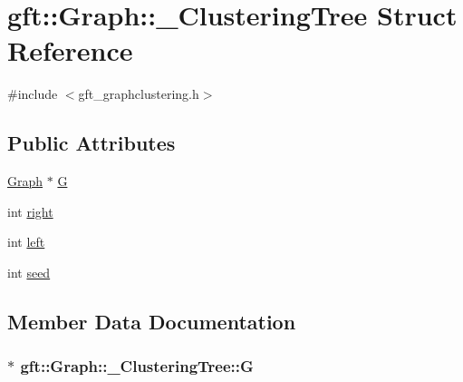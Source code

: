 \hypertarget{structgft_1_1Graph_1_1__ClusteringTree}{}\section{gft\+:\+:Graph\+:\+:\+\_\+\+Clustering\+Tree Struct Reference}
\label{structgft_1_1Graph_1_1__ClusteringTree}


{\ttfamily \#include $<$gft\+\_\+graphclustering.\+h$>$}

\subsection*{Public Attributes}
\begin{DoxyCompactItemize}
\item 
\hyperlink{namespacegft_1_1Graph_a95acabdf6e7f5b884255558bef5d3f8b}{Graph} $\ast$ \hyperlink{structgft_1_1Graph_1_1__ClusteringTree_a6072777eeeb5df9bee7d9db716b69bad}{G}
\item 
int \hyperlink{structgft_1_1Graph_1_1__ClusteringTree_ac4fb245b23f6fad40fb1b65522b8556d}{right}
\item 
int \hyperlink{structgft_1_1Graph_1_1__ClusteringTree_a8ab019740ed0e9fd7f33bc9b15f38c1e}{left}
\item 
int \hyperlink{structgft_1_1Graph_1_1__ClusteringTree_abf12465052dd18a231fe816330ab737c}{seed}
\end{DoxyCompactItemize}


\subsection{Member Data Documentation}
\subsubsection[{\texorpdfstring{G}{G}}]{$\ast$ gft\+::\+Graph\+::\+\_\+\+Clustering\+Tree\+::G}\hypertarget{structgft_1_1Graph_1_1__ClusteringTree_a6072777eeeb5df9bee7d9db716b69bad}{}\label{structgft_1_1Graph_1_1__ClusteringTree_a6072777eeeb5df9bee7d9db716b69bad}
